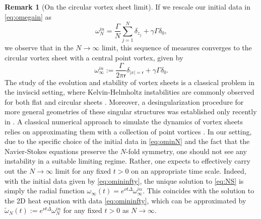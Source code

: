 \documentclass[11pt,reqno,a4paper]{amsart}
\newcommand{\1}{\mathbbm{1}}
\theoremstyle{definition}
\newtheorem{remark}[proposition]{Remark}
\theoremstyle{definition}
\numberwithin{equation}{section}
\begin{document}
\begin{remark}[On the circular vortex sheet limit]
\label{rem:sheet}
If we rescale our initial data in \cref{eq:omegain} as
\begin{equation}
\label{eq:ominN}
    \omega^{in}_N = \frac{\Gamma}{N}\sum_{j=1}^N\delta_{z_j}+\gamma \Gamma\delta_0,
\end{equation}
we observe that in the $N\to \infty$ limit, this sequence of measures converges to the circular vortex sheet with a central point vortex, given by 
\begin{equation}
    \label{eq:omininfty}
    \omega^{in}_{\infty} := \frac{\Gamma}{2\pi \mathsf{r}}\delta_{|x|=\mathsf{r}} + \gamma\Gamma \delta_0.
\end{equation}
The study of the evolution and stability of vortex sheets is a classical problem in the inviscid setting, where Kelvin-Helmholtz instabilities are commonly observed for both flat and circular sheets \cite{krasny1986study,MajdaBertozzi,moore1974stability,wilcox2024modern}. Moreover, a desingularization procedure for more general geometries of these singular structures was established only recently in \cite{enciso2025desingularization}.  A classical numerical approach to simulate the dynamics of vortex sheets relies on approximating them with a collection of point vortices \cite{krasny1986study}. In our setting, due to the specific choice of the initial data in \cref{eq:ominN} and the fact that the Navier-Stokes equations preserve the $N$-fold symmetry, one should not see any instability in a suitable limiting regime. Rather, one expects to effectively carry out the $N\to \infty$ limit for any fixed $t>0$ on an appropriate time scale. Indeed, with the initial data given by \cref{eq:omininfty}, the unique solution to \cref{eq:NS} is simply the radial function $\omega_\infty(t)= e^{\nu t \Delta}\omega_{\infty}^{in}$. This coincides with the solution to the 2D heat equation with data \cref{eq:omininfty}, which can be approximated by $\widetilde{\omega}_N (t):= e^{\nu t \Delta}\omega_{N}^{in}$ for any fixed $t>0$ as $N\to \infty$.


\end{remark}
\end{document}
